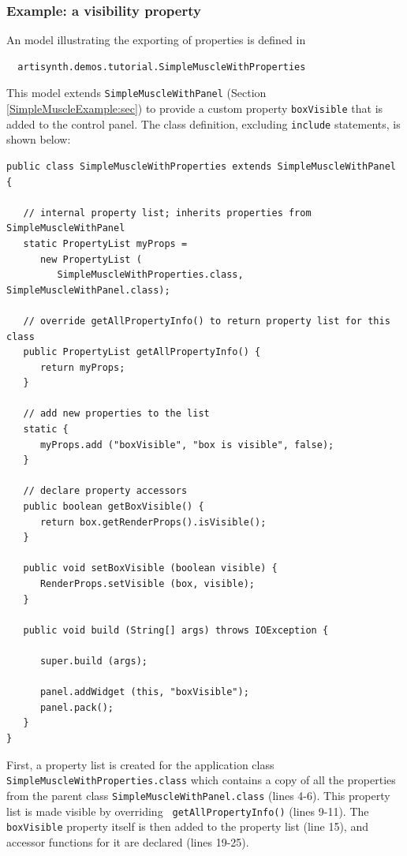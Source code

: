 \subsubsection{Example: a visibility property}
%
An model illustrating the exporting of properties is defined in
%
\begin{verbatim}
  artisynth.demos.tutorial.SimpleMuscleWithProperties
\end{verbatim}
%
This model extends {\tt SimpleMuscleWithPanel} (Section
\ref{SimpleMuscleExample:sec}) to provide a custom property
{\tt boxVisible} that is added to the control panel.
The class definition, excluding {\tt include} statements,
is shown below:
%
\lstset{numbers=left}
\begin{lstlisting}[]
public class SimpleMuscleWithProperties extends SimpleMuscleWithPanel {

   // internal property list; inherits properties from SimpleMuscleWithPanel
   static PropertyList myProps =
      new PropertyList (
         SimpleMuscleWithProperties.class, SimpleMuscleWithPanel.class);

   // override getAllPropertyInfo() to return property list for this class
   public PropertyList getAllPropertyInfo() {
      return myProps;
   }

   // add new properties to the list
   static {
      myProps.add ("boxVisible", "box is visible", false);
   }

   // declare property accessors
   public boolean getBoxVisible() {
      return box.getRenderProps().isVisible();
   }

   public void setBoxVisible (boolean visible) {
      RenderProps.setVisible (box, visible);
   }

   public void build (String[] args) throws IOException {

      super.build (args);

      panel.addWidget (this, "boxVisible");
      panel.pack();
   }
}
\end{lstlisting}
\lstset{numbers=none}
%
First, a property list is created for the application class {\tt
SimpleMuscleWithProperties.class} which contains a copy of all the
properties from the parent class {\tt SimpleMuscleWithPanel.class}
(lines 4-6). This property list is made visible by overriding {\tt
getAllPropertyInfo()} (lines 9-11). The {\tt boxVisible} property
itself is then added to the property list (line 15), and accessor
functions for it are declared (lines 19-25).

